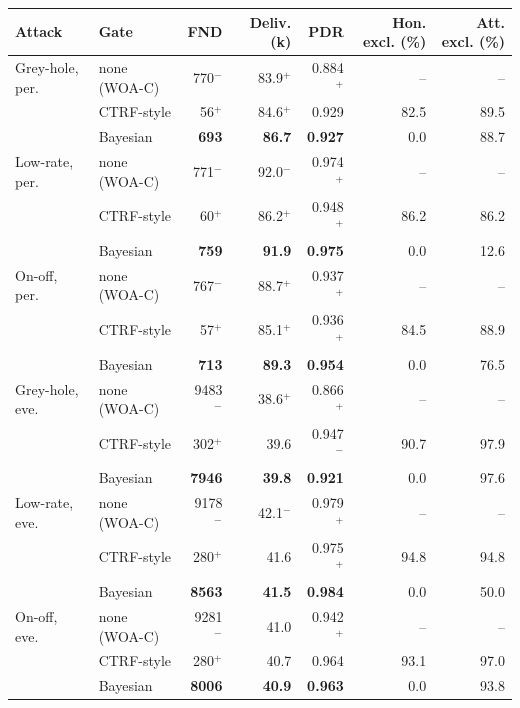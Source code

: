 \begin{tabular}{llrrrrr}
\toprule
Attack & Gate & FND & Deliv. (k) & PDR & Hon. excl. (\%) & Att. excl. (\%) \\
\midrule
Grey-hole, per. & none (WOA-C) & 770$^{-}$ & 83.9$^{+}$ & 0.884$^{+}$ & -- & -- \\
 & CTRF-style & 56$^{+}$ & 84.6$^{+}$ & 0.929 & 82.5 & 89.5 \\
 & Bayesian & \textbf{693} & \textbf{86.7} & \textbf{0.927} & 0.0 & 88.7 \\
\midrule
Low-rate, per. & none (WOA-C) & 771$^{-}$ & 92.0$^{-}$ & 0.974$^{+}$ & -- & -- \\
 & CTRF-style & 60$^{+}$ & 86.2$^{+}$ & 0.948$^{+}$ & 86.2 & 86.2 \\
 & Bayesian & \textbf{759} & \textbf{91.9} & \textbf{0.975} & 0.0 & 12.6 \\
\midrule
On-off, per. & none (WOA-C) & 767$^{-}$ & 88.7$^{+}$ & 0.937$^{+}$ & -- & -- \\
 & CTRF-style & 57$^{+}$ & 85.1$^{+}$ & 0.936$^{+}$ & 84.5 & 88.9 \\
 & Bayesian & \textbf{713} & \textbf{89.3} & \textbf{0.954} & 0.0 & 76.5 \\
\midrule
Grey-hole, eve. & none (WOA-C) & 9483$^{-}$ & 38.6$^{+}$ & 0.866$^{+}$ & -- & -- \\
 & CTRF-style & 302$^{+}$ & 39.6 & 0.947$^{-}$ & 90.7 & 97.9 \\
 & Bayesian & \textbf{7946} & \textbf{39.8} & \textbf{0.921} & 0.0 & 97.6 \\
\midrule
Low-rate, eve. & none (WOA-C) & 9178$^{-}$ & 42.1$^{-}$ & 0.979$^{+}$ & -- & -- \\
 & CTRF-style & 280$^{+}$ & 41.6 & 0.975$^{+}$ & 94.8 & 94.8 \\
 & Bayesian & \textbf{8563} & \textbf{41.5} & \textbf{0.984} & 0.0 & 50.0 \\
\midrule
On-off, eve. & none (WOA-C) & 9281$^{-}$ & 41.0 & 0.942$^{+}$ & -- & -- \\
 & CTRF-style & 280$^{+}$ & 40.7 & 0.964 & 93.1 & 97.0 \\
 & Bayesian & \textbf{8006} & \textbf{40.9} & \textbf{0.963} & 0.0 & 93.8 \\
\bottomrule
\end{tabular}
